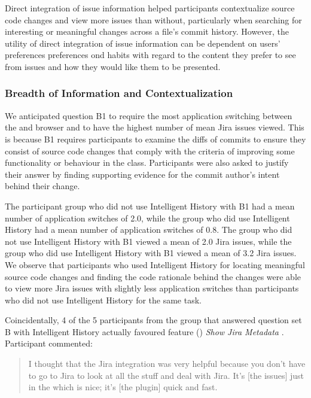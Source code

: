 \begin{summary}[RQ3]
  Direct integration of issue information helped participants contextualize source code changes and view more issues than without,
  particularly when searching for interesting or meaningful changes across a file's commit history.
  However, the utility of direct integration of issue information can be dependent on users' preferences preferences ond habits 
  with regard to the content they prefer to see from issues and how they would like them to be presented.
\end{summary}

\subsubsection{Breadth of Information and Contextualization}

We anticipated question B1 to require the most application switching between the  and browser and to have the highest number of mean Jira issues viewed.
This is because B1 requires participants to examine the diffs of commits to ensure they consist of source code changes that comply with the criteria of improving some functionality or behaviour in the  class.
Participants were also asked to justify their answer by finding supporting evidence for the commit author's intent behind their change.

The participant group who did not use Intelligent History with B1 had a mean number of application switches of 2.0,
while the group who did use Intelligent History had a mean number of application switches of 0.8.
The group who did not use Intelligent History with B1 viewed a mean of 2.0 Jira issues,
while the group who did use Intelligent History with B1 viewed a mean of 3.2 Jira issues.
We observe that participants who used Intelligent History for locating meaningful source code changes and finding the code rationale behind the changes
were able to view more Jira issues with slightly less application switches than participants who did not use Intelligent History for the same task.

Coincidentally, 4 of the 5 participants from the group that answered question set B with Intelligent History actually favoured feature () \textit{Show Jira Metadata} .
Participant  commented:

\begin{quote}
  I thought that the Jira integration was very helpful because you don’t have to go to Jira to look at all the stuff and deal with Jira. 
  It’s [the issues] just in the  which is nice; it’s [the plugin] quick and fast.
\end{quote}

